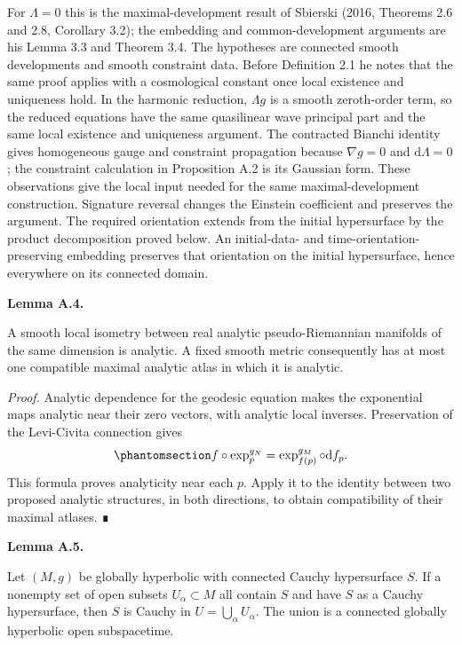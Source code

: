 \documentclass[
  english,
  11pt,
  reqno]{amsart}
\makeatletter
\newcounter{none} %
\newcommand{\pandocstatementheading}[1]{%
  \par\addpenalty{\@beginparpenalty}%
  \addvspace{.5\baselineskip plus .2\baselineskip minus .2\baselineskip}%
  {\normalfont\bfseries #1\par}%
  \nobreak\@afterindenttrue\@afterheading
}
\makeatother
\begin{document}
For \(\Lambda=0\) this is the maximal-development result of Sbierski
(2016, Theorems 2.6 and 2.8, Corollary 3.2); the embedding and
common-development arguments are his Lemma 3.3 and Theorem 3.4. The
hypotheses are connected smooth developments and smooth constraint data.
Before Definition 2.1 he notes that the same proof applies with a
cosmological constant once local existence and uniqueness hold. In the
harmonic reduction, \(\Lambda g\) is a smooth zeroth-order term, so the
reduced equations have the same quasilinear wave principal part and the
same local existence and uniqueness argument. The contracted Bianchi
identity gives homogeneous gauge and constraint propagation because
\(\nabla g=0\) and \(\mathrm d\Lambda=0\); the constraint calculation in
Proposition A.2 is its Gaussian form. These observations give the local
input needed for the same maximal-development construction. Signature
reversal changes the Einstein coefficient and preserves the argument.
The required orientation extends from the initial hypersurface by the
product decomposition proved below. An initial-data- and
time-orientation-preserving embedding preserves that orientation on the
initial hypersurface, hence everywhere on its connected domain.

\pandocstatementheading{\protect{}\label{lem:analytic-isometries}Lemma A.4.}

A smooth local isometry between real analytic pseudo-Riemannian
manifolds of the same dimension is analytic. A fixed smooth metric
consequently has at most one compatible maximal analytic atlas in which
it is analytic.

\emph{Proof.} Analytic dependence for the geodesic equation makes the
exponential maps analytic near their zero vectors, with analytic local
inverses. Preservation of the Levi-Civita connection gives
\begin{equation}\protect\phantomsection\label{eq:analytic-isometry-exponential}{
f\circ\exp_p^{g_N}
 =\exp_{f(p)}^{g_M}\circ\mathrm df_p.
}\end{equation} This formula proves analyticity near each \(p\). Apply
it to the identity between two proposed analytic structures, in both
directions, to obtain compatibility of their maximal atlases. ∎

\pandocstatementheading{\protect{}\label{lem:cauchy-union}Lemma A.5.}

Let \((M,g)\) be globally hyperbolic with connected Cauchy hypersurface
\(S\). If a nonempty set of open subsets \(U_\alpha\subset M\) all
contain \(S\) and have \(S\) as a Cauchy hypersurface, then \(S\) is
Cauchy in \(U=\bigcup_\alpha U_\alpha\). The union is a connected
globally hyperbolic open subspacetime.
\end{document}
